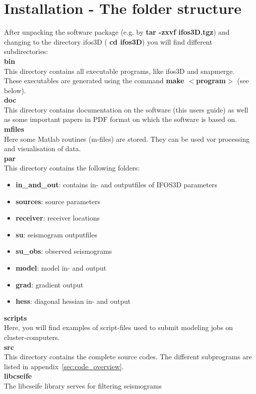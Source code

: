 \section{Installation - The folder structure}
After unpacking the software package (e.g. by  \textbf{tar -zxvf ifos3D.tgz}) and changing to the directory ifos3D ( \textbf{cd ifos3D})  you will find different subdirectories:\vspace{0.2cm}\\
\textbf{bin}\\
This directory contains all executable programs, like ifos3D and snapmerge. These executables are generated using the command  \textbf{make $<$program$>$} (see below).\vspace{0.2cm}\\
\textbf{doc}\\
This directory contains documentation on the software (this users guide) as well as some important papers in PDF format on which the software is based on.\vspace{0.2cm}\\ 
\textbf{mfiles}\\
Here some Matlab routines (m-files) are stored. They can be used vor processing and visualisation of data. \vspace{0.2cm}\\
\textbf{par}\\
This directory contains the following folders:
\begin{itemize}
 \item \textbf{in\_and\_out}: contains in- and outputfiles of IFOS3D parameters
 \item \textbf{sources}: source parameters
 \item \textbf{receiver}: receiver locations
 \item \textbf{su}: seismogram outputfiles
 \item \textbf{su\_obs}: observed seismograms
 \item \textbf{model}: model in- and output
 \item \textbf{grad}: gradient output
 \item \textbf{hess}: diagonal hessian in- and output
\end{itemize}\vspace{0.2cm}
\textbf{scripts}\\
Here, you will find examples of script-files used to submit modeling jobs on cluster-computers.\vspace{0.2cm}\\
\textbf{src}\\ 
This directory contains the complete source codes. The different subprograms are listed in appendix~\ref{sec:code_overview}.\vspace{0.2cm}\\
\textbf{libcseife}\\
The libcseife library serves for filtering seismograms
